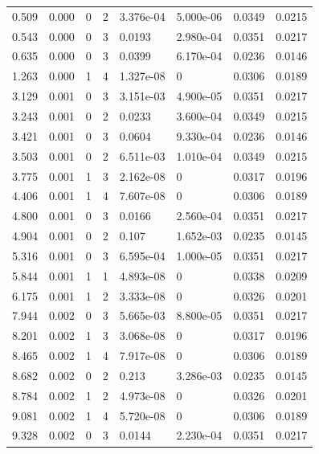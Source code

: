 \documentclass[preview]{standalone}
\begin{document}
{{\begin{tabular}{L{1.2cm}C{1.2cm} C{0.3cm}C{0.5cm} C{1.4cm}C{1.4cm} C{1.4cm}C{1.4cm}}
  0.509  &  0.000  & 0     &  2 &  3.376e-04  & 5.000e-06  & 0.0349 &  0.0215   \\ 
  0.543  &  0.000  & 0     &  3 &  0.0193  & 2.980e-04  & 0.0351 &  0.0217   \\ 
  0.635  &  0.000  & 0     &  3 &  0.0399  & 6.170e-04  & 0.0236 &  0.0146   \\ 
  1.263  &  0.000  & 1     &  4 &  1.327e-08  & 0  & 0.0306 &  0.0189   \\ 
  3.129  &  0.001  & 0     &  3 &  3.151e-03  & 4.900e-05  & 0.0351 &  0.0217   \\ 
  3.243  &  0.001  & 0     &  2 &  0.0233  & 3.600e-04  & 0.0349 &  0.0215   \\ 
  3.421  &  0.001  & 0     &  3 &  0.0604  & 9.330e-04  & 0.0236 &  0.0146   \\ 
  3.503  &  0.001  & 0     &  2 &  6.511e-03  & 1.010e-04  & 0.0349 &  0.0215   \\ 
  3.775  &  0.001  & 1     &  3 &  2.162e-08  & 0  & 0.0317 &  0.0196   \\ 
  4.406  &  0.001  & 1     &  4 &  7.607e-08  & 0  & 0.0306 &  0.0189   \\ 
  4.800  &  0.001  & 0     &  3 &  0.0166  & 2.560e-04  & 0.0351 &  0.0217   \\ 
  4.904  &  0.001  & 0     &  2 &  0.107  & 1.652e-03  & 0.0235 &  0.0145   \\ 
  5.316  &  0.001  & 0     &  3 &  6.595e-04  & 1.000e-05  & 0.0351 &  0.0217   \\ 
  5.844  &  0.001  & 1     &  1 &  4.893e-08  & 0  & 0.0338 &  0.0209   \\ 
  6.175  &  0.001  & 1     &  2 &  3.333e-08  & 0  & 0.0326 &  0.0201   \\ 
  7.944  &  0.002  & 0     &  3 &  5.665e-03  & 8.800e-05  & 0.0351 &  0.0217   \\ 
  8.201  &  0.002  & 1     &  3 &  3.068e-08  & 0  & 0.0317 &  0.0196   \\ 
  8.465  &  0.002  & 1     &  4 &  7.917e-08  & 0  & 0.0306 &  0.0189   \\ 
  8.682  &  0.002  & 0     &  2 &  0.213  & 3.286e-03  & 0.0235 &  0.0145   \\ 
  8.784  &  0.002  & 1     &  2 &  4.973e-08  & 0  & 0.0326 &  0.0201   \\ 
  9.081  &  0.002  & 1     &  4 &  5.720e-08  & 0  & 0.0306 &  0.0189   \\ 
  9.328  &  0.002  & 0     &  3 &  0.0144  & 2.230e-04  & 0.0351 &  0.0217   \\ 

\end{tabular}}}
\end{document}
